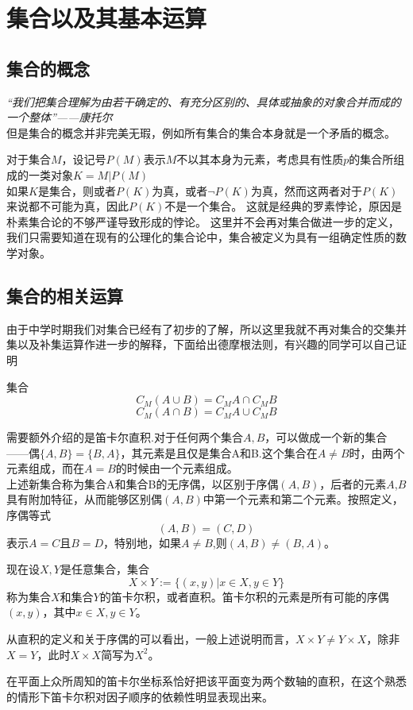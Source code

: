 \section{集合以及其基本运算}
\subsection{集合的概念}
{\large\textit{“我们把集合理解为由若干确定的、有充分区别的、具体或抽象的对象合并而成的一个整体”——康托尔}}\\


但是集合的概念并非完美无瑕，例如所有集合的集合本身就是一个矛盾的概念。

对于集合$M$，设记号$P(M)$表示$M$不以其本身为元素，考虑具有性质$p$的集合所组成的一类对象$K={M|P(M)}$\\
如果$K$是集合，则或者$P(K)$为真，或者$\neg P(K)$为真，然而这两者对于$P(K)$来说都不可能为真，因此$P(K)$不是一个集合。
这就是经典的罗素悖论，原因是朴素集合论的不够严谨导致形成的悖论。
这里并不会再对集合做进一步的定义，我们只需要知道在现有的公理化的集合论中，集合被定义为具有一组确定性质的数学对象。
\subsection{集合的相关运算}
由于中学时期我们对集合已经有了初步的了解，所以这里我就不再对集合的交集并集以及补集运算作进一步的解释，下面给出德摩根法则，有兴趣的同学可以自己证明
\begin{definition}{集合}{}
		\[C_M(A\cup   B)=C_MA\cap C_MB \]
        \[C_M(A\cap B)=C_MA\cup C_MB \]
	\end{definition}%
需要额外介绍的是笛卡尔直积.对于任何两个集合$A,B$，可以做成一个新的集合——偶$\{A,B\}=\{B,A\}$，其元素是且仅是集合A和B.这个集合在$A\neq B$时，由两个元素组成，而在$A=B$的时候由一个元素组成。\\

上述新集合称为集合A和集合B的无序偶，以区别于序偶$(A,B)$，后者的元素$A$,$B$具有附加特征，从而能够区别偶$(A,B)$中第一个元素和第二个元素。按照定义，序偶等式
\[(A,B)=(C,D)\]
表示$A=C$且$B=D$，特别地，如果$A\neq B$,则$(A,B)\neq (B,A)$。

现在设$X,Y$是任意集合，集合
\[X\times Y:=\{(x,y)|x\in X,y\in Y\}\]
称为集合$X$和集合$Y$的笛卡尔积，或者直积。笛卡尔积的元素是所有可能的序偶$(x,y)$，其中$x\in X,y\in Y$。

从直积的定义和关于序偶的可以看出，一般上述说明而言，$X\times Y\neq Y\times X$，除非$X=Y$，此时$X\times X$简写为$X^2$。

在平面上众所周知的笛卡尔坐标系恰好把该平面变为两个数轴的直积，在这个熟悉的情形下笛卡尔积对因子顺序的依赖性明显表现出来。

